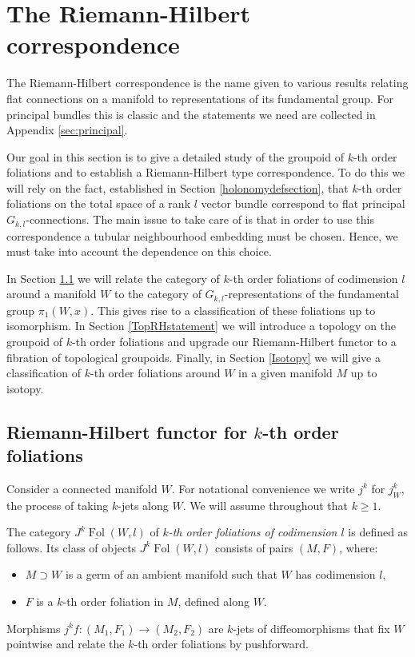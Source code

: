 \documentclass[10pt]{amsart}
\newcommand{\FolCat}{{\underline{\operatorname{Fol}}}}
\newcommand{\FolObj}{{\operatorname{Fol}}}
\numberwithin{theoremalpha}{section}
\numberwithin{equation}{section}
\numberwithin{definition}{section}
\numberwithin{theorem}{section}
\numberwithin{proposition}{section}
\numberwithin{lemma}{section}
\numberwithin{example}{section}
\numberwithin{remark}{section}
\numberwithin{corollary}{section}
\numberwithin{question}{section}
\numberwithin{problem}{section}
\numberwithin{assumption}{section}
\theoremstyle{named}
\numberwithin{equation}{section}
\begin{document}

\section{The Riemann-Hilbert correspondence}\label{sec:Riemann--Hilbert}
The Riemann-Hilbert correspondence is the name given to various results relating flat connections on a manifold to representations of its fundamental group. For principal bundles this is classic and the statements we need are collected in Appendix \ref{sec:principal}. 

Our goal in this section is to give a detailed study of the groupoid of $k$-th order foliations and to establish a Riemann-Hilbert type correspondence. To do this we will rely on the fact, established in Section \ref{holonomydefsection}, that $k$-th order foliations on the total space of a rank $l$ vector bundle correspond to flat principal $G_{k,l}$-connections. The main issue to take care of is that in order to use this correspondence a tubular neighbourhood embedding must be chosen. Hence, we must take into account the dependence on this choice. 

In Section \ref{CatRHstatement} we will relate the category of $k$-th order foliations of codimension $l$ around a manifold $W$ to the category of $G_{k,l}$-representations of the fundamental group $\pi_{1}(W,x)$. This gives rise to a classification of these foliations up to isomorphism. In Section \ref{TopRHstatement} we will introduce a topology on the groupoid of $k$-th order foliations and upgrade our Riemann-Hilbert functor to a fibration of topological groupoids. Finally, in Section \ref{Isotopy} we will give a classification of $k$-th order foliations around $W$ in a given manifold $M$ up to isotopy. 


\subsection{Riemann-Hilbert functor for $k$-th order foliations} \label{CatRHstatement}

Consider a connected manifold $W$. For notational convenience we write $j^k$ for $j^k_W$, the process of taking $k$-jets along $W$. We will assume throughout that $k \geq 1$. 

\begin{definition}
 
The category $J^{k}\FolCat(W,l)$ of \emph{$k$-th order foliations of codimension $l$} is defined as follows. Its class of objects $J^{k}\FolObj(W,l)$ consists of pairs $(M, F)$, where:
\begin{itemize}
\item $M \supset W$ is a germ of an ambient manifold such that $W$ has codimension $l$, 
\item $F$ is a $k$-th order foliation in $M$, defined along $W$.
\end{itemize}
Morphisms $j^kf : (M_1,F_1) \rightarrow (M_2,F_2)$ are $k$-jets of diffeomorphisms that fix $W$ pointwise and relate the $k$-th order foliations by pushforward. 
\end{definition}
\end{document}
